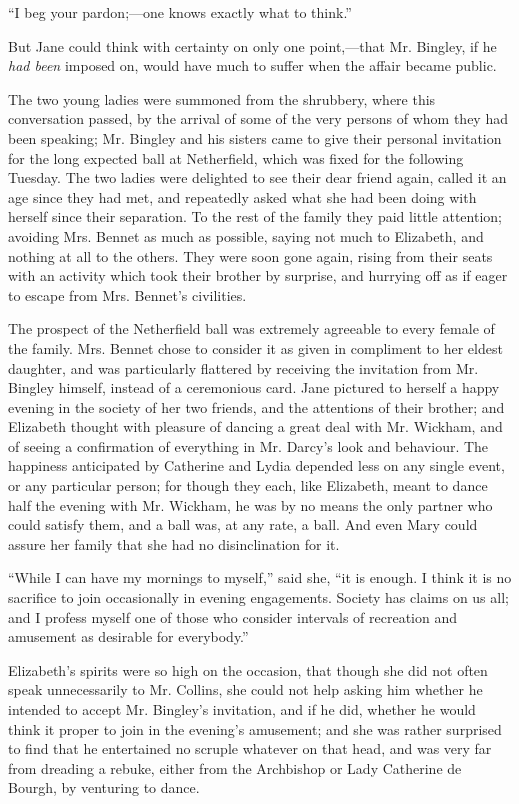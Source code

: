 \documentclass[12pt]{book}
\begin{document}
``I beg your pardon;---one knows exactly what to think.''

But Jane could think with certainty on only one point,---that Mr. Bingley, if he \textit{had been} imposed on, would have much to suffer when the affair became public.

The two young ladies were summoned from the shrubbery, where this conversation passed, by the arrival of some of the very persons of whom they had been speaking; Mr. Bingley and his sisters came to give their personal invitation for the long expected ball at Netherfield, which was fixed for the following Tuesday. The two ladies were delighted to see their dear friend again, called it an age since they had met, and repeatedly asked what she had been doing with herself since their separation. To the rest of the family they paid little attention; avoiding Mrs. Bennet as much as possible, saying not much to Elizabeth, and nothing at all to the others. They were soon gone again, rising from their seats with an activity which took their brother by surprise, and hurrying off as if eager to escape from Mrs. Bennet's civilities.

The prospect of the Netherfield ball was extremely agreeable to every female of the family. Mrs. Bennet chose to consider it as given in compliment to her eldest daughter, and was particularly flattered by receiving the invitation from Mr. Bingley himself, instead of a ceremonious card. Jane pictured to herself a happy evening in the society of her two friends, and the attentions of their brother; and Elizabeth thought with pleasure of dancing a great deal with Mr. Wickham, and of seeing a confirmation of everything in Mr. Darcy's look and behaviour. The happiness anticipated by Catherine and Lydia depended less on any single event, or any particular person; for though they each, like Elizabeth, meant to dance half the evening with Mr. Wickham, he was by no means the only partner who could satisfy them, and a ball was, at any rate, a ball. And even Mary could assure her family that she had no disinclination for it.

``While I can have my mornings to myself,'' said she, ``it is enough. I think it is no sacrifice to join occasionally in evening engagements. Society has claims on us all; and I profess myself one of those who consider intervals of recreation and amusement as desirable for everybody.''

Elizabeth's spirits were so high on the occasion, that though she did not often speak unnecessarily to Mr. Collins, she could not help asking him whether he intended to accept Mr. Bingley's invitation, and if he did, whether he would think it proper to join in the evening's amusement; and she was rather surprised to find that he entertained no scruple whatever on that head, and was very far from dreading a rebuke, either from the Archbishop or Lady Catherine de Bourgh, by venturing to dance.
\end{document}
